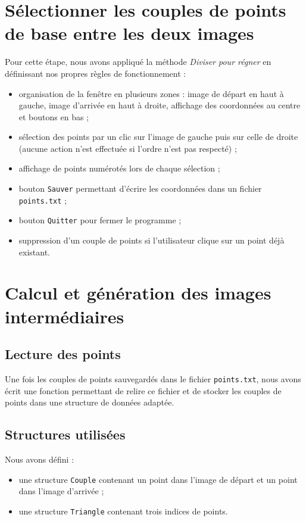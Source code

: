 \documentclass[11pt,a4paper]{article}
\begin{document}
	\section{Sélectionner les couples de points de base entre les deux images}
	
	Pour cette étape, nous avons appliqué la méthode \emph{Diviser pour régner} en définissant nos propres règles de fonctionnement :
	\begin{itemize}
		\item organisation de la fenêtre en plusieurs zones : image de départ en haut à gauche, image d’arrivée en haut à droite, affichage des coordonnées au centre et boutons en bas ;
		\item sélection des points par un clic sur l’image de gauche puis sur celle de droite (aucune action n’est effectuée si l’ordre n’est pas respecté) ;
		\item affichage de points numérotés lors de chaque sélection ;
		\item bouton \texttt{Sauver} permettant d’écrire les coordonnées dans un fichier \texttt{points.txt} ;
		\item bouton \texttt{Quitter} pour fermer le programme ;
		\item suppression d’un couple de points si l’utilisateur clique sur un point déjà existant.
	\end{itemize}
	
	\section{Calcul et génération des images intermédiaires}
	
	\subsection{Lecture des points}
	Une fois les couples de points sauvegardés dans le fichier \texttt{points.txt}, nous avons écrit une fonction permettant de relire ce fichier et de stocker les couples de points dans une structure de données adaptée.
	
	\subsection{Structures utilisées}
	Nous avons défini :
	\begin{itemize}
		\item une structure \texttt{Couple} contenant un point dans l’image de départ et un point dans l’image d’arrivée ;
		\item une structure \texttt{Triangle} contenant trois indices de points.
	\end{itemize}
	
\end{document}
